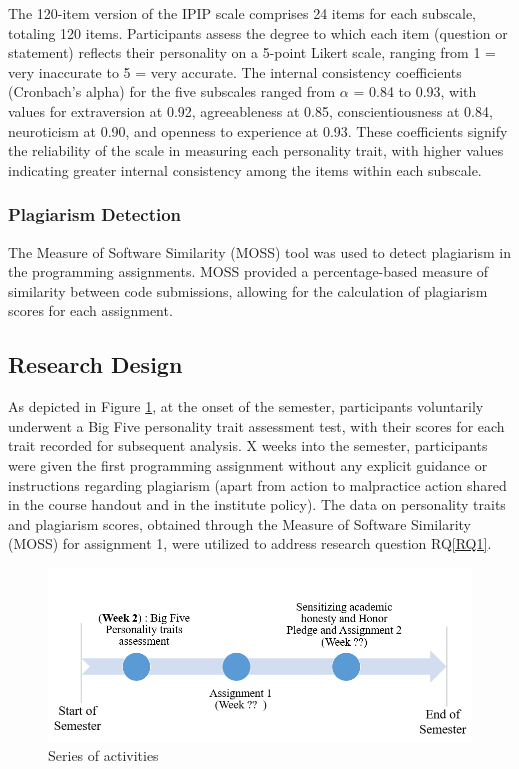 The 120-item version of the IPIP scale comprises 24 items for each subscale, totaling 120 items. Participants assess the degree to which each item (question or statement) reflects their personality on a 5-point Likert scale, ranging from 1 = very inaccurate to 5 = very accurate. The internal consistency coefficients (Cronbach's alpha) for the five subscales ranged from \begin{math} \alpha \end{math} = 0.84 to 0.93, with values for extraversion at 0.92, agreeableness at 0.85, conscientiousness at 0.84, neuroticism at 0.90, and openness to experience at 0.93. These coefficients signify the reliability of the scale in measuring each personality trait, with higher values indicating greater internal consistency among the items within each subscale.

\subsubsection{Plagiarism Detection}
The Measure of Software Similarity (MOSS) tool \cite{MOSS} was used to detect plagiarism in the programming assignments. MOSS provided a percentage-based measure of similarity between code submissions, allowing for the calculation of plagiarism scores for each assignment. 

\subsection{Research Design}
As depicted in Figure \ref{fig:activityTimeline}, at the onset of the semester, participants voluntarily underwent a Big Five personality trait assessment test, with their scores for each trait recorded for subsequent analysis. X weeks into the semester, participants were given the first programming assignment without any explicit guidance or instructions regarding plagiarism (apart from action to malpractice action shared in the course handout and in the institute policy). The data on personality traits and plagiarism scores, obtained through the Measure of Software Similarity (MOSS) for assignment 1, were utilized to address research question RQ\ref{RQ1}.

\begin{figure}[ht]
  \centering
  \includegraphics[width=\columnwidth]{2.png}
  \caption{Series of activities}
  \label{fig:activityTimeline}
\end{figure}

